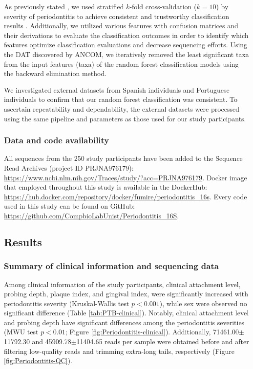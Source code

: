 \documentclass[11pt, a4paper, onecolumn, oneside]{report}
\begin{document}
                As previously stated \cite{Periodontitis-diagnosis-8}, we used stratified $k$-fold cross-validation ($k=10$) by severity of periodontitis to achieve consistent and trustworthy classification results \cite{Kfold-1}. Additionally, we utilized various features with confusion matrices and their derivations to evaluate the classification outcomes in order to identify which features optimize classification evaluations and decrease sequencing efforts. Using the DAT discovered by ANCOM, we iteratively removed the least significant taxa from the input features (taxa) of the random forest classification models using the backward elimination method.

                We investigated external datasets from Spanish individuals \cite{Periodontitis-10} and Portuguese individuals \cite{Periodontitis-Portuguese-1} to confirm that our random forest classification was consistent. To ascertain repeatability and dependability, the external datasets were processed using the same pipeline and parameters as those used for our study participants.

            \subsubsection{Data and code availability}
                All sequences from the 250 study participants have been added to the Sequence Read Archives (project ID PRJNA976179): \url{https://www.ncbi.nlm.nih.gov/Traces/study/?acc=PRJNA976179}. Docker image that employed throughout this study is available in the DockerHub: \url{https://hub.docker.com/repository/docker/fumire/periodontitis_16s}. Every code used in this study can be found on GitHub: \url{https://github.com/CompbioLabUnist/Periodontitis_16S}.
        \newpage

        \subsection{Results}
            \subsubsection{Summary of  clinical information and sequencing data}
                Among clinical information of the study participants, clinical attachment level, probing depth, plaque index, and gingival index, were significantly increased with periodontitis severity (Kruskal-Wallis test $p < 0.001$), while sex were observed no significant difference (Table \ref{tab:PTB-clinical}). Notably, clinical attachment level and probing depth have significant differences among the periodontitis severities (MWU test $p < 0.01$; Figure \ref{fig:Periodontitis-clinical}). Additionally, 71461.00$\pm$11792.30 and 45909.78$\pm$11404.65 reads per sample were obtained before and after filtering low-quality reads and trimming extra-long tails, respectively (Figure \ref{fig:Periodontitis-QC}).
\end{document}
